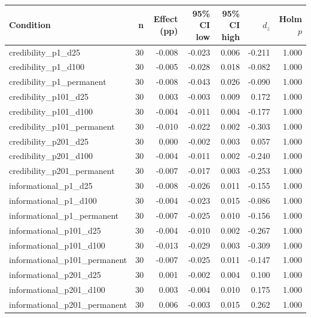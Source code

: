 \begin{tabular}{lrrrrrr}
\toprule
Condition & n & Effect (pp) & 95\% CI low & 95\% CI high & $d_z$ & Holm $p$ \\
\midrule
credibility_p1_d25 & 30 & -0.008 & -0.023 & 0.006 & -0.211 & 1.000 \\
credibility_p1_d100 & 30 & -0.005 & -0.028 & 0.018 & -0.082 & 1.000 \\
credibility_p1_permanent & 30 & -0.008 & -0.043 & 0.026 & -0.090 & 1.000 \\
credibility_p101_d25 & 30 & 0.003 & -0.003 & 0.009 & 0.172 & 1.000 \\
credibility_p101_d100 & 30 & -0.004 & -0.011 & 0.004 & -0.177 & 1.000 \\
credibility_p101_permanent & 30 & -0.010 & -0.022 & 0.002 & -0.303 & 1.000 \\
credibility_p201_d25 & 30 & 0.000 & -0.002 & 0.003 & 0.057 & 1.000 \\
credibility_p201_d100 & 30 & -0.004 & -0.011 & 0.002 & -0.240 & 1.000 \\
credibility_p201_permanent & 30 & -0.007 & -0.017 & 0.003 & -0.253 & 1.000 \\
informational_p1_d25 & 30 & -0.008 & -0.026 & 0.011 & -0.155 & 1.000 \\
informational_p1_d100 & 30 & -0.004 & -0.023 & 0.015 & -0.086 & 1.000 \\
informational_p1_permanent & 30 & -0.007 & -0.025 & 0.010 & -0.156 & 1.000 \\
informational_p101_d25 & 30 & -0.004 & -0.010 & 0.002 & -0.267 & 1.000 \\
informational_p101_d100 & 30 & -0.013 & -0.029 & 0.003 & -0.309 & 1.000 \\
informational_p101_permanent & 30 & -0.007 & -0.025 & 0.011 & -0.147 & 1.000 \\
informational_p201_d25 & 30 & 0.001 & -0.002 & 0.004 & 0.100 & 1.000 \\
informational_p201_d100 & 30 & 0.003 & -0.004 & 0.010 & 0.175 & 1.000 \\
informational_p201_permanent & 30 & 0.006 & -0.003 & 0.015 & 0.262 & 1.000 \\
\bottomrule
\end{tabular}
